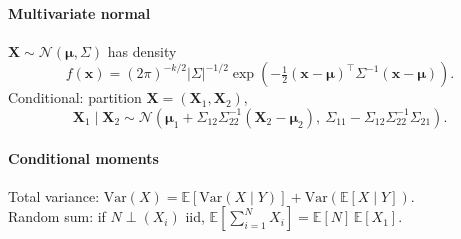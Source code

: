 \paragraph{Multivariate normal}
$\mathbf{X}\sim \mathcal{N}(\boldsymbol\mu,\Sigma)$ has density
\[f(\mathbf x)=(2\pi)^{-k/2}|\Sigma|^{-1/2}\exp\!\left(-\tfrac{1}{2}(\mathbf x-\boldsymbol\mu)^\top\Sigma^{-1}(\mathbf x-\boldsymbol\mu)\right).\]
\textcolor{Bittersweet}{Conditional}: partition $\mathbf X=(\mathbf X_1,\mathbf X_2)$,
\[\mathbf X_1\mid\mathbf X_2\sim \mathcal{N}\!\left(\boldsymbol\mu_1+\Sigma_{12}\Sigma_{22}^{-1}(\mathbf X_2-\boldsymbol\mu_2),\ \Sigma_{11}-\Sigma_{12}\Sigma_{22}^{-1}\Sigma_{21}\right).\]

\paragraph{Conditional moments}
\textcolor{Bittersweet}{Total variance}:
$\mathrm{Var}(X)=\mathbb{E}[\mathrm{Var}(X\mid Y)]+\mathrm{Var}(\mathbb{E}[X\mid Y])$.\\
\textcolor{Bittersweet}{Random sum}: if $N\perp(X_i)$ iid,
$\mathbb{E}\!\left[\sum_{i=1}^N X_i\right]=\mathbb{E}[N]\,\mathbb{E}[X_1]$.
